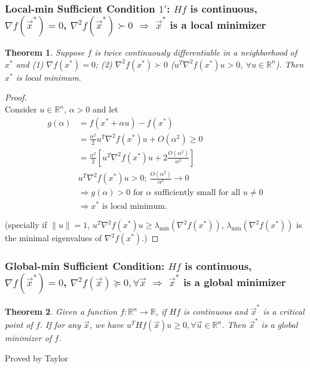 \documentclass[11pt,a4paper]{article}
\newtheorem{theorem}{Theorem}
\begin{document}
\subsubsection{Local-min Sufficient Condition $1'$: $Hf$ is continuous, $\nabla f(\vec{x}^*)=0$, $\nabla^2 f(\vec{x}^*)\succ 0$ $\Rightarrow$ $\vec{x}^*$ is a local minimizer}
\begin{theorem}
Suppose $f$ is twice continuously differentiable in a neighborhood of $x^*$ and
(1) $\nabla f(x^*)=0$; (2) $\nabla^2 f(x^*)\succ 0$ ($u^T\nabla^2 f(x^*) u>0$, $\forall u\in \mathbb{R}^n$).
Then $x^*$ is local minimum.
\end{theorem}
\begin{proof}
\quad\\
Consider $u\in \mathbb{R}^n$, $\alpha>0$ and let
\begin{equation}
    \begin{aligned}
        g(\alpha)&=f(x^*+\alpha u)-f(x^*)\\
        &=\frac{\alpha^2}{2}u^T\nabla^2 f(x^*) u+O(\alpha^2)\geq 0\\
        &=\frac{\alpha^2}{2}[u^T\nabla^2 f(x^*) u+2\frac{O(\alpha^2)}{\alpha^2}]\\
        &u^T\nabla^2 f(x^*) u>0;\ \frac{O(\alpha^2)}{\alpha^2}\rightarrow 0\\
        &\Rightarrow g(\alpha)>0\text{ for }\alpha\text{ sufficiently small for all }u\neq 0\\
        &\Rightarrow x^*\text{ is local minimum}.
    \end{aligned}
    \nonumber
\end{equation}

(specially if $\|u\|=1$, $u^T\nabla^2 f(x^*) u\geq \lambda_{\min}(\nabla^2 f(x^*))$, $\lambda_{\min}(\nabla^2 f(x^*))$ is the minimal eigenvalues of $\nabla^2 f(x^*)$.)
\end{proof}

\subsubsection{Global-min Sufficient Condition: $Hf$ is continuous, $\nabla f(\vec{x}^*)=0$, $\nabla^2f(\vec{x})\succeq 0,\forall \vec{x}$ $\Rightarrow$ $\vec{x}^*$ is a global minimizer}
\begin{theorem}
    Given a function $f:\mathbb{R}^n \rightarrow \mathbb{R}$, if $Hf$ is continuous and $\vec{x}^*$ is a critical point of
    $f$. If for any $\vec{x}$, we have $u^T Hf(\vec{x}) u\geq 0, \forall \vec{u}\in \mathbb{R}^n$. Then $\vec{x}^*$ is a global minimizer of $f$.
\end{theorem}
Proved by Taylor
\end{document}
